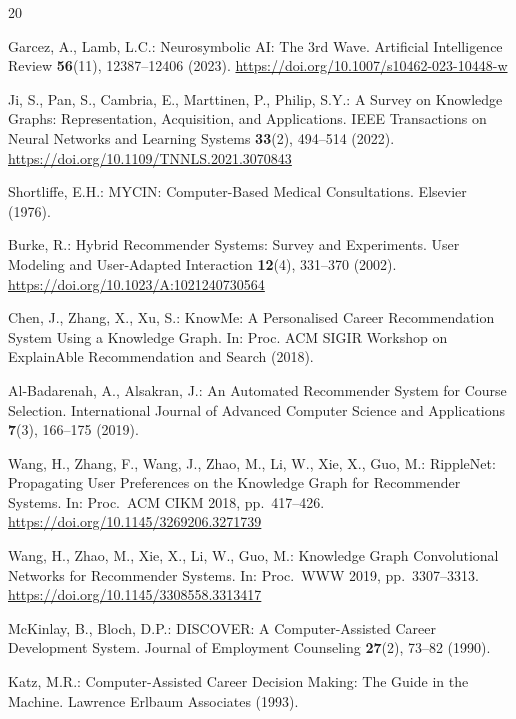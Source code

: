 \documentclass[runningheads]{llncs}
\begin{document}
\begin{thebibliography}{20}

Garcez, A., Lamb, L.C.:
Neurosymbolic AI: The 3rd Wave.
Artificial Intelligence Review \textbf{56}(11), 12387--12406 (2023).
\url{https://doi.org/10.1007/s10462-023-10448-w}

Ji, S., Pan, S., Cambria, E., Marttinen, P., Philip, S.Y.:
A Survey on Knowledge Graphs: Representation, Acquisition, and Applications.
IEEE Transactions on Neural Networks and Learning Systems \textbf{33}(2), 494--514 (2022).
\url{https://doi.org/10.1109/TNNLS.2021.3070843}

Shortliffe, E.H.:
MYCIN: Computer-Based Medical Consultations.
Elsevier (1976).

Burke, R.:
Hybrid Recommender Systems: Survey and Experiments.
User Modeling and User-Adapted Interaction \textbf{12}(4), 331--370 (2002).
\url{https://doi.org/10.1023/A:1021240730564}

Chen, J., Zhang, X., Xu, S.:
KnowMe: A Personalised Career Recommendation System Using a Knowledge Graph.
In: Proc. ACM SIGIR Workshop on ExplainAble Recommendation and Search (2018).

Al-Badarenah, A., Alsakran, J.:
An Automated Recommender System for Course Selection.
International Journal of Advanced Computer Science and Applications \textbf{7}(3), 166--175 (2019).

Wang, H., Zhang, F., Wang, J., Zhao, M., Li, W., Xie, X., Guo, M.:
RippleNet: Propagating User Preferences on the Knowledge Graph for Recommender Systems.
In: Proc.\ ACM CIKM 2018, pp.\ 417--426.
\url{https://doi.org/10.1145/3269206.3271739}

Wang, H., Zhao, M., Xie, X., Li, W., Guo, M.:
Knowledge Graph Convolutional Networks for Recommender Systems.
In: Proc.\ WWW 2019, pp.\ 3307--3313.
\url{https://doi.org/10.1145/3308558.3313417}

McKinlay, B., Bloch, D.P.:
DISCOVER: A Computer-Assisted Career Development System.
Journal of Employment Counseling \textbf{27}(2), 73--82 (1990).

Katz, M.R.:
Computer-Assisted Career Decision Making: The Guide in the Machine.
Lawrence Erlbaum Associates (1993).


\end{thebibliography}
\end{document}
